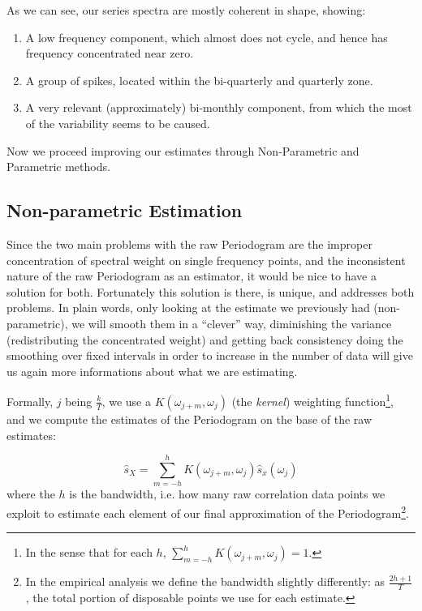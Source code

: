 \documentclass[12pt]{article} %
\begin{document}
As we can see, our series spectra are mostly coherent in shape, showing:

\begin{enumerate}
\item A low frequency component, which almost does not cycle, and hence has frequency concentrated near zero.
\item A group of spikes, located within the bi-quarterly and quarterly zone.
\item A very relevant (approximately) bi-monthly component, from which the most of the variability seems to be caused.
\end{enumerate}

Now we proceed improving our estimates through Non-Parametric and Parametric methods.

\subsection{Non-parametric Estimation}

Since the two main problems with the raw Periodogram are the improper concentration of spectral weight on single frequency points, and the inconsistent nature of the raw Periodogram as an estimator, it would be nice to have a solution for both. Fortunately this solution is there, is unique, and addresses both problems. In plain words, only looking at the estimate we previously had (non-parametric), we will smooth them in a ``clever'' way, diminishing the variance (redistributing the concentrated weight) and getting back consistency doing the smoothing over fixed intervals in order to increase in the number of data will give us again more informations about what we are estimating.

Formally, $j$ being $\frac{k}{T}$, we use a $K(\omega_{j+m},\omega_j)$ (the {\em kernel}) weighting function\footnote{
In the sense that for each $h$, $\sum_{m=-h}^{h}K(\omega_{j+m},\omega_j)=1$.}, and we compute the estimates of the Periodogram on the base of the raw estimates:

\begin{equation}
\hat{s}_X=\sum\limits_{m=-h}^{h} K(\omega_{j+m},\omega_j)\hat{s}_x(\omega_j)
\end{equation}where the $h$ is the bandwidth, i.e. how many raw correlation data points we exploit to estimate each element of our final approximation of the Periodogram\footnote{In the empirical analysis we define the bandwidth slightly differently: as $\frac{2h+1}{T}$, the total portion of disposable points we use for each estimate.}. 
\end{document}

